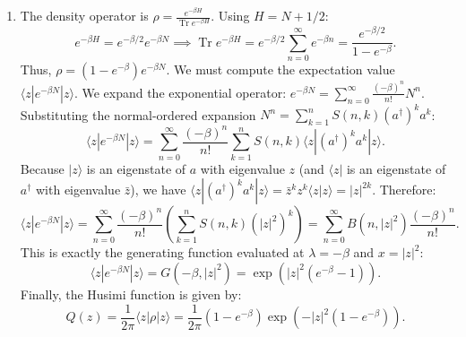 \documentclass{article}
\begin{document}
\begin{enumerate}[label=\fbox{\arabic*}]
\begin{enumerate}[label=(\roman*)]
          \item The density operator is $\rho = \frac{e^{-\beta H}}{\operatorname{Tr} e^{-\beta H}}$. Using $H = N + 1/2$:
          \[
            e^{-\beta H} = e^{-\beta/2} e^{-\beta N} \implies \operatorname{Tr} e^{-\beta H} = e^{-\beta/2} \sum_{n=0}^\infty e^{-\beta n} = \frac{e^{-\beta/2}}{1 - e^{-\beta}}.
          \]
          Thus, $\rho = (1 - e^{-\beta}) e^{-\beta N}$. 
          We must compute the expectation value $\langle z | e^{-\beta N} | z \rangle$.
          We expand the exponential operator: $e^{-\beta N} = \sum_{n=0}^\infty \frac{(-\beta)^n}{n!} N^n$.
          Substituting the normal-ordered expansion $N^n = \sum_{k=1}^n S(n, k) (a^\dagger)^k a^k$:
          \[
            \langle z | e^{-\beta N} | z \rangle = \sum_{n=0}^\infty \frac{(-\beta)^n}{n!} \sum_{k=1}^n S(n, k) \langle z | (a^\dagger)^k a^k | z \rangle.
          \]
          Because $|z\rangle$ is an eigenstate of $a$ with eigenvalue $z$ (and $\langle z|$ is an eigenstate of $a^\dagger$ with eigenvalue $\bar{z}$), we have $\langle z | (a^\dagger)^k a^k | z \rangle = \bar{z}^k z^k \langle z | z \rangle = |z|^{2k}$.
          Therefore:
          \[
            \langle z | e^{-\beta N} | z \rangle = \sum_{n=0}^\infty \frac{(-\beta)^n}{n!} \left( \sum_{k=1}^n S(n, k) (|z|^2)^k \right) = \sum_{n=0}^\infty B(n, |z|^2) \frac{(-\beta)^n}{n!}.
          \]
          This is exactly the generating function evaluated at $\lambda = -\beta$ and $x = |z|^2$:
          \[
            \langle z | e^{-\beta N} | z \rangle = G(-\beta, |z|^2) = \exp(|z|^2(e^{-\beta} - 1)).
          \]
          Finally, the Husimi function is given by:
          \[
            Q(z) = \frac{1}{2\pi} \langle z | \rho | z \rangle = \frac{1}{2\pi} (1 - e^{-\beta}) \exp\left( -|z|^2(1 - e^{-\beta}) \right).
          \]
        \end{enumerate}
\end{enumerate}
\end{document}
